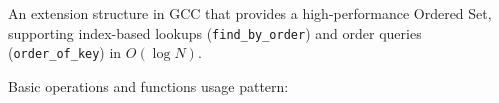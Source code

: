 
An extension structure in GCC that provides a high-performance Ordered Set, supporting index-based lookups (\lstinline|find_by_order|) and order queries (\lstinline|order_of_key|) in $O(\log N)$.



Basic operations and functions usage pattern:

